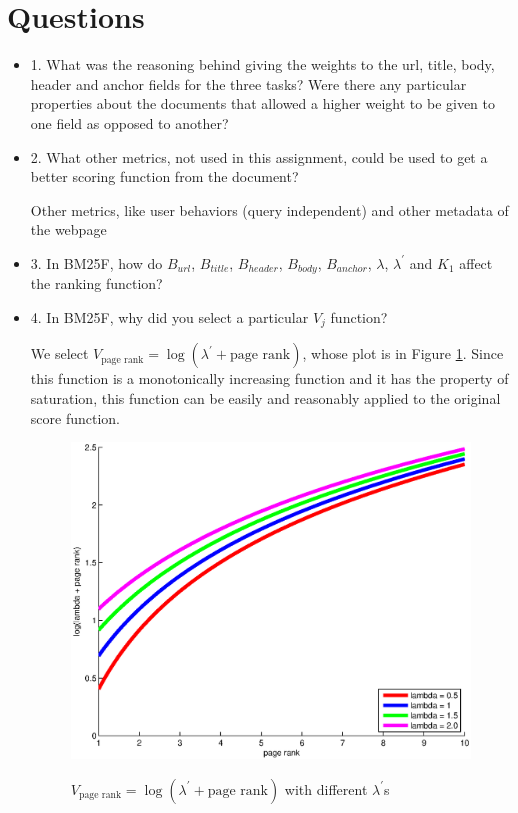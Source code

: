 \section{Questions}
\begin{itemize}
  \item[] 1. What was the reasoning behind giving the weights to the url, title, body, header and anchor fields for the three tasks? Were there any particular properties about the documents that allowed a higher weight to be given to one field as opposed to another?


  \item[] 2. What other metrics, not used in this assignment, could be used to get a better scoring function from the document?

      Other metrics, like user behaviors (query independent) and other metadata of the webpage

  \item[] 3. In BM25F, how do $B_{url}$, $B_{title}$, $B_{header}$, $B_{body}$, $B_{anchor}$, $\lambda$, $\lambda^\prime$ and $K_1$ affect the ranking function?

  \item[] 4. In BM25F, why did you select a particular $V_j$ function?

  We select $V_\textrm{page rank} = \log(\lambda^\prime + \textrm{page rank})$, whose plot is in Figure \ref{img:logfunction}. Since this function is a monotonically increasing function and it has the property of saturation, this function can be easily and reasonably applied to the original score function.
\begin{figure}
\begin{center}
  \includegraphics[width=\textwidth]{V_function.eps} \\
  \caption{$V_\textrm{page rank} = \log(\lambda^\prime + \textrm{page rank})$ with different $\lambda^\prime$s}\label{img:logfunction}
\end{center}
\end{figure}



\end{itemize}
